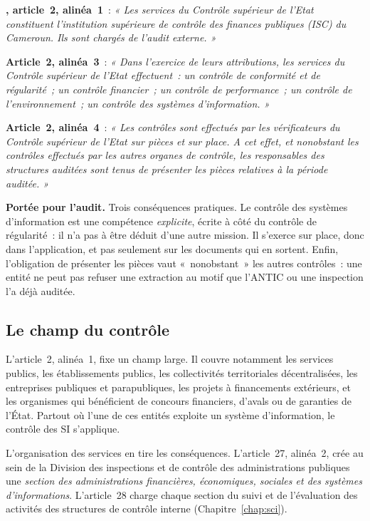 \begin{boxjuris}
\textbf{, article~2, alinéa~1}~: \textit{« Les
services du Contrôle supérieur de l'Etat constituent l'institution
supérieure de contrôle des finances publiques (ISC) du Cameroun. Ils sont
chargés de l'audit externe. »}

\medskip
\textbf{Article~2, alinéa~3}~: \textit{« Dans l'exercice de leurs
attributions, les services du Contrôle supérieur de l'Etat effectuent~:
un contrôle de conformité et de régularité~; un contrôle financier~; un
contrôle de performance~; un contrôle de l'environnement~; un contrôle des
systèmes d'information. »}

\medskip
\textbf{Article~2, alinéa~4}~: \textit{« Les contrôles sont effectués par
les vérificateurs du Contrôle supérieur de l'Etat sur pièces et sur place.
A cet effet, et nonobstant les contrôles effectués par les autres organes
de contrôle, les responsables des structures auditées sont tenus de
présenter les pièces relatives à la période auditée. »}

\medskip
\textbf{Portée pour l'audit.} Trois conséquences pratiques. Le contrôle
des systèmes d'information est une compétence \emph{explicite}, écrite à
côté du contrôle de régularité~: il n'a pas à être déduit d'une autre
mission. Il s'exerce sur place, donc dans l'application, et pas seulement
sur les documents qui en sortent. Enfin, l'obligation de présenter les
pièces vaut «~nonobstant~» les autres contrôles~: une entité ne peut pas
refuser une extraction au motif que l'ANTIC ou une inspection l'a déjà
auditée.
\end{boxjuris}

\subsection{Le champ du contrôle}

L'article~2, alinéa~1, fixe un champ large. Il couvre notamment les
services publics, les établissements publics, les collectivités
territoriales décentralisées, les entreprises publiques et parapubliques,
les projets à financements extérieurs, et les organismes qui bénéficient
de concours financiers, d'avals ou de garanties de l'État. Partout où
l'une de ces entités exploite un système d'information, le contrôle des
SI s'applique.

L'organisation des services en tire les conséquences. L'article~27,
alinéa~2, crée au sein de la Division des inspections et de contrôle des
administrations publiques une \emph{section des administrations
financières, économiques, sociales et des systèmes d'informations}.
L'article~28 charge chaque section du suivi et de l'évaluation des
activités des structures de contrôle interne
(Chapitre~\ref{chap:sci}).

